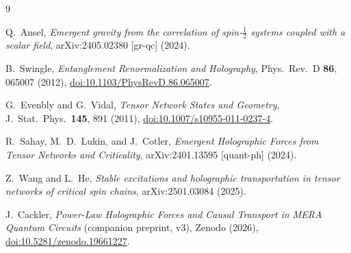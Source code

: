 \documentclass[11pt]{article}
\begin{document}
\begin{thebibliography}{9}

Q.~Ansel,
\emph{Emergent gravity from the correlation of spin-$\tfrac{1}{2}$ systems coupled with a
scalar field},
arXiv:2405.02380 [gr-qc] (2024).

B.~Swingle,
\emph{Entanglement Renormalization and Holography},
Phys.\ Rev.\ D \textbf{86}, 065007 (2012),
\href{https://doi.org/10.1103/PhysRevD.86.065007}{doi:10.1103/PhysRevD.86.065007}.

G.~Evenbly and G.~Vidal,
\emph{Tensor Network States and Geometry},
J.\ Stat.\ Phys.\ \textbf{145}, 891 (2011),
\href{https://doi.org/10.1007/s10955-011-0237-4}{doi:10.1007/s10955-011-0237-4}.

R.~Sahay, M.~D.~Lukin, and J.~Cotler,
\emph{Emergent Holographic Forces from Tensor Networks and Criticality},
arXiv:2401.13595 [quant-ph] (2024).

Z.~Wang and L.~He,
\emph{Stable excitations and holographic transportation in tensor networks of critical
spin chains},
arXiv:2501.03084 (2025).

J.~Cackler,
\emph{Power-Law Holographic Forces and Causal Transport in MERA Quantum Circuits}
(companion preprint, v3), Zenodo (2026),
\href{https://doi.org/10.5281/zenodo.19661227}{doi:10.5281/zenodo.19661227}.

\end{thebibliography}
\end{document}
